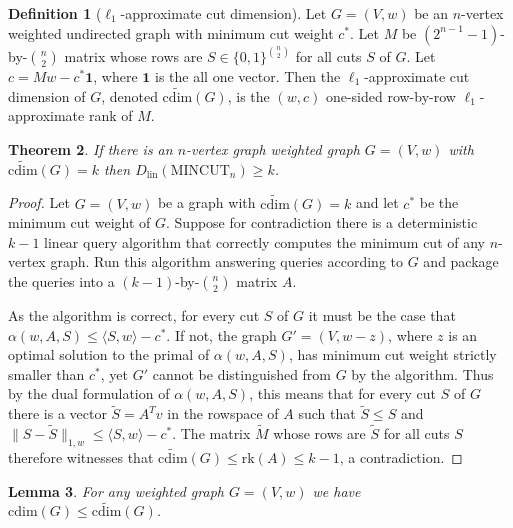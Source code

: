\documentclass[10pt,a4paper]{article}
\newcommand{\MINCUT}{\mathrm{MINCUT}}
\newcommand{\lin}{\mathrm{lin}}
\newcommand{\cd}{\mathrm{cdim}}
\newcommand{\braket}[2]{\langle#1, #2\rangle}
\newcommand{\rk}{\mathrm{rk}}
\newcommand{\1}{\mathbf{1}}
\newtheorem{theorem}{Theorem}
\newtheorem{lemma}[theorem]{Lemma}
\theoremstyle{definition}
\newtheorem{definition}[theorem]{Definition}
\begin{document}
\begin{definition}[$\ell_1$-approximate cut dimension]
Let {$G = (V,w)$} be an $n$-vertex weighted undirected graph with minimum cut weight $c^*$.
Let $M$ be $(2^{n-1}-1)$-by-$\binom{n}{2}$ matrix whose rows are $S \in  \{0,1\}^{\binom{n}{2}}$ for all cuts $S$ of $G$.
Let $c = Mw - c^*\1$, where $\1$ is the all one vector.  Then the $\ell_1$-approximate cut dimension of $G$, denoted $\widetilde{\cd}(G)$, is
the $(w,c)$ one-sided row-by-row $\ell_1$-approximate rank of $M$.
\end{definition}

\begin{theorem}
\label{thm:approx_cut}
If there is an $n$-vertex graph {weighted graph $G = (V,w)$} with $\widetilde{\cd}(G) = k$
then $D_\lin(\MINCUT_n) \ge k$.
\end{theorem}

\begin{proof}
Let $G = (V,w)$ be a graph with $\widetilde{\cd}(G) = k$ and let $c^*$ be the minimum cut weight of $G$.  Suppose for
contradiction there is a deterministic $k-1$ linear query algorithm that correctly computes the minimum cut of any
$n$-vertex graph.  Run this algorithm answering queries according to $G$ and
package the queries into a $(k-1)$-by-$\binom{n}{2}$ matrix $A$.

As the algorithm is correct, for every cut $S$ of $G$ it must be the case that $\alpha(w,A,S) \le \braket{S}{w} -c^*$.  If not, the graph $G' = (V,w-z)$, where $z$ is an optimal
solution to the primal of $\alpha(w,A,S)$, has minimum cut weight strictly smaller than $c^*$, yet $G'$ cannot be distinguished from $G$ by the algorithm.
Thus by the dual formulation of $\alpha(w,A,S)$, this means that for every cut $S$ of $G$ there is a vector $\tilde{S}= A^T v$ in the rowspace of $A$ such
that $\tilde S \le S$ and $\|S-\tilde{S}\|_{1,w} \le \braket{S}{w} -c^*$.  The matrix $\tilde M$ whose rows are $\tilde S$ for all
cuts $S$ therefore witnesses that $\widetilde{\cd}(G) \le \rk(A) \le k-1$, a contradiction.
\end{proof}

\begin{lemma}
\label{lem:cdless}
For any weighted graph $G = (V,w)$ we have $\cd(G) \le \widetilde{\cd}(G)$.
\end{lemma}
\end{document}
